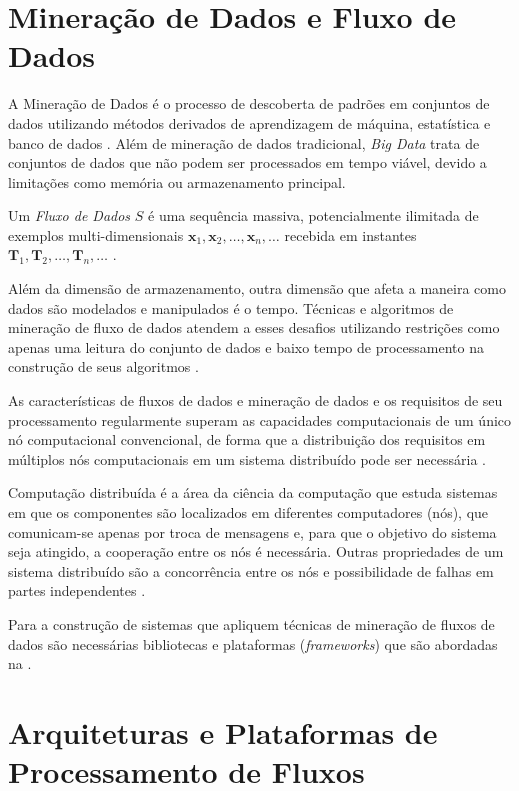 \section{Mineração de Dados e Fluxo de Dados}

A Mineração de Dados é o processo de descoberta de padrões em conjuntos de dados
utilizando métodos derivados de aprendizagem de máquina, estatística e banco de
dados \cite{Gaber2005}.
Além de mineração de dados tradicional, \emph{Big Data} trata de
conjuntos de dados que não podem ser processados em tempo viável, devido a limitações
como memória ou armazenamento principal.

\begin{definition}
    Um \textit{Fluxo de Dados} $S$ é uma sequência massiva, potencialmente
    ilimitada de exemplos multi-dimensionais
    $\mathbf{x}_1, \mathbf{x}_2, \dots, \mathbf{x}_n, \dots$
    recebida em instantes
    $\mathbf{T}_1, \mathbf{T}_2, \dots, \mathbf{T}_n, \dots$
    \cite{Aggarwal2003}.
\end{definition}

Além da dimensão de armazenamento, outra dimensão que afeta a maneira como dados
são modelados e manipulados é o tempo.
Técnicas e algoritmos de mineração de fluxo de dados atendem a esses desafios utilizando
restrições como apenas uma leitura do conjunto de dados e baixo tempo de
processamento na construção de seus algoritmos \cite{Gama2007, Gaber2005}.

As características de fluxos de dados e mineração de dados e os requisitos de
seu processamento regularmente superam as capacidades computacionais de um único
nó computacional convencional, de forma que a distribuição dos requisitos em
múltiplos nós computacionais em um sistema distribuído pode ser necessária
\cite{Gaber2005}.

Computação distribuída é a área da ciência da computação que estuda sistemas
em que os componentes são localizados em diferentes computadores (nós), que
comunicam-se apenas por troca de mensagens e, para que o objetivo do sistema
seja atingido, a cooperação entre os nós é necessária.
Outras propriedades de um sistema distribuído são a concorrência entre os nós e
possibilidade de
falhas em partes independentes \cite{TanenbaumSteen2018}.

Para a construção de sistemas que apliquem técnicas de mineração de fluxos de
dados são necessárias bibliotecas e plataformas (\emph{frameworks})
que são abordadas na .

\section{Arquiteturas e Plataformas de Processamento de Fluxos}
\label{sec:frameworks}

